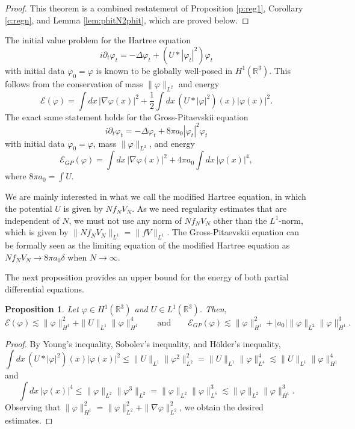 \documentclass[11pt,a4paper,draft,DIV11]{scrartcl}	%
\newtheorem{prp}[thm]{Proposition}
\newcommand{\R}{\mathds{R}}
\newcommand{\norm}[1]{\lVert#1\rVert}	%
\begin{document}
\begin{proof}
  This theorem is a combined restatement of Proposition \ref{p:reg1},
  Corollary \ref{c:regn}, and Lemma \ref{lem:phitN2phit}, which are proved
  below.
\end{proof}


The initial value problem for the Hartree equation
\[
  i \partial_t \varphi_t = - \Delta \varphi_t + (U * |\varphi_t|^2)
  \varphi_t
\]
with initial data $\varphi_0 = \varphi$ is known to be globally well-posed
in $H^1(\R^3)$. This follows from the conservation of mass $\| \varphi
\|_{L^2}$ and energy
\[
  \mathcal{E}(\varphi) = \int dx \, |\nabla \varphi(x)|^2 + \frac{1}{2} \int
  dx \, (U * |\varphi|^2)(x) |\varphi(x)|^2.
\]
The exact same statement holds for the Gross-Pitaevskii equation
\[
  i \partial_t \varphi_t = - \Delta \varphi_t + 8 \pi a_0 |\varphi_t|^2
  \varphi_t
\]
with initial data $\varphi_0 = \varphi$, mass $\| \varphi \|_{L^2}$, and
energy
\[
  \mathcal{E}_{GP}(\varphi) = \int dx \, |\nabla \varphi(x)|^2 + 4 \pi a_0
  \int dx \, |\varphi(x)|^4,
\]
where $8 \pi a_0 = \int U$.


We are mainly interested in what we call the modified Hartree equation, in
which the potential $U$ is given by $N f_N V_N$. As we need regularity
estimates that are independent of $N$, we must not use any norm of
$N f_N V_N$ other than
the $L^1$-norm, which is given by $\norm{N f_N V_N}_{L^1} = \| fV \|_{L^1}$.
The Gross-Pitaevskii equation can be formally seen as the limiting equation of the modified Hartree
equation as $N f_N V_N \to 8 \pi a_0 \delta$ when $N \to \infty$.


The next proposition provides an upper bound for the energy of both partial
differential equations.


\begin{prp} \label{p:energy}
  Let $\varphi \in H^1(\R^3)$ and $U \in L^1(\R^3)$. Then,
  \[
    \mathcal{E}(\varphi) \apprle \| \varphi \|_{H^1}^2 + \| U \|_{L^1} \|
    \varphi \|_{H^1}^4 \qquad \text{and} \qquad \mathcal{E}_{GP}(\varphi)
    \apprle \| \varphi \|_{H^1}^2 + |a_0| \| \varphi \|_{L^2} \| \varphi
    \|_{H^1}^3.
  \]
\end{prp}


\begin{proof}
  By Young's inequality, Sobolev's inequality, and H\"older's inequality, 
  \[
    \int dx \, (U * |\varphi|^2)(x) |\varphi(x)|^2 \le \| U \|_{L^1} \|
    \varphi^2 \|_{L^2}^2 = \| U \|_{L^1} \| \varphi \|_{L^4}^4 \apprle \| U
    \|_{L^1} \| \varphi \|_{H^1}^4
  \]
  and
  \[
    \int dx \, |\varphi(x)|^4 \le \| \varphi \|_{L^2} \| \varphi^3 \|_{L^2} =
    \| \varphi \|_{L^2} \| \varphi \|_{L^6}^3 \apprle \| \varphi \|_{L^2} \|
    \varphi \|_{H^1}^3.
  \]
  Observing that $\| \varphi \|_{H^1}^2 = \| \varphi \|_{L^2}^2 + \| \nabla
  \varphi \|_{L^2}^2$, we obtain the desired estimates.
\end{proof}
\end{document}
